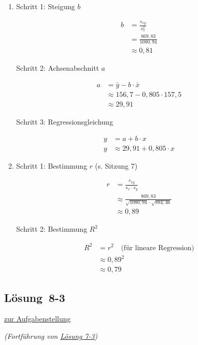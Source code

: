 \documentclass[
  11pt,
  ngerman,
  a4paper,
]{report}
\begin{document}
\begin{enumerate}
\def\labelenumi{\alph{enumi})}
\item
  Schritt 1: Steigung \(b\)

  \[\begin{aligned}
   b&=\frac{s_{xy}}{s^2_x}\\
    &=\frac{869{,}83}{1080{,}94}\\
    &\approx0{,}81
   \end{aligned}\]

  Schritt 2: Achsenabschnitt \(a\)

  \[\begin{aligned}
   a&=\bar{y}-b\cdot\bar{x}\\
   &\approx 156{,}7-0{,}805\cdot157{,}5\\
   &\approx 29{,}91
   \end{aligned}\]

  Schritt 3: Regressionsgleichung

  \[\begin{aligned}
   y&=a+b\cdot x\\
   y&\approx 29{,}91 + 0{,}805 \cdot x
   \end{aligned}\]
\item
  Schritt 1: Bestimmung \(r\) (s. Sitzung 7)

  \[\begin{aligned}
   r&=\frac{s_{xy}}{s_x\cdot s_y}\\
   &\approx\frac{869{,}83}{\sqrt{1080{,}94}\cdot\sqrt{884{,}46}}\\
   &\approx0{,}89
   \end{aligned}\]

  Schritt 2: Bestimmung \(R^2\)

  \[\begin{aligned}
   R^2&=r^2 \quad \textrm{(für lineare Regression)}\\
   &\approx 0{,}89^2\\
   &\approx0{,}79
   \end{aligned}\]
\end{enumerate}

\hypertarget{loesung-8-3}{%
\subsection{Lösung~8-3}\label{loesung-8-3}}

\protect\hyperlink{aufgabe-8-3}{zur Aufgabenstellung}

\emph{(Fortführung von \protect\hyperlink{loesung-7-3}{Lösung 7-3})}
\end{document}
